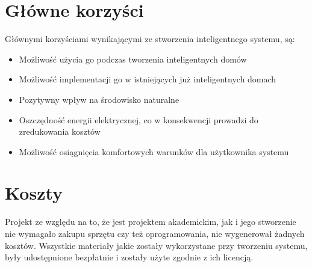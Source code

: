 \documentclass{article}
\begin{document}
\section{Główne korzyści}
Głównymi korzyściami wynikającymi ze stworzenia inteligentnego systemu, są:
\begin{itemize}
\item Możliwość użycia go podczas tworzenia inteligentnych domów
\item Możliwość implementacji go w istniejących już inteligentnych domach
\item Pozytywny wpływ na środowisko naturalne
\item Oszczędność energii elektrycznej, co w konsekwencji prowadzi do zredukowania kosztów
\item Możliwość osiągnięcia komfortowych warunków dla użytkownika systemu
\end{itemize}

\section{Koszty}
Projekt ze względu na to, że jest projektem akademickim, jak i jego stworzenie nie wymagało zakupu sprzętu czy też oprogramowania, nie wygenerował żadnych kosztów. Wszystkie materiały jakie zostały wykorzystane przy tworzeniu systemu, były udostępnione bezpłatnie i zostały użyte zgodnie z ich licencją.
\end{document}
